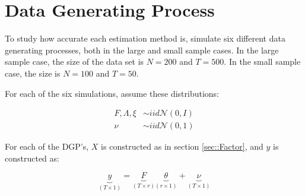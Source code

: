 
\section{Data Generating Process} \label{sec::dgp}

To study how accurate each estimation method is, \citeauthor{carrasco2016sample} simulate six different data generating processes, both in the large and small sample cases. In the large sample case, the size of the data set is $N = 200$ and $T = 500$. In the small sample case, the size is $N = 100$ and $T = 50$.

For each of the six simulations, \citeauthor{carrasco2016sample} assume these distributions:

\begin{align}
	F, \Lambda, \xi &\sim iid\mathcal{N}(0, I) \\
	\nonumber \nu &\sim iid\mathcal{N}(0, 1)
\end{align}

For each of the DGP's, $X$ is constructed as in section \ref{sec::Factor}, and $y$ is constructed as:



\[\underbrace{y}_{(T \times 1)} = \underbrace{F}_{(T \times r)} \underbrace{\theta}_{(r \times 1)} + \underbrace{\nu}_{(T \times 1)}\]


